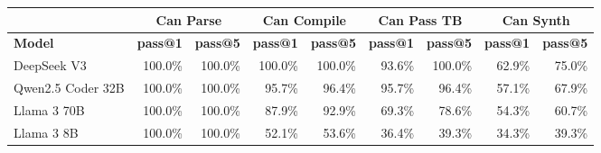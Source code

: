 \begin{tabular}{l|rr|rr|rr|rr}
\cmidrule[\heavyrulewidth]{2-9}
 & \multicolumn{2}{c|}{\textbf{Can Parse}} & \multicolumn{2}{c|}{\textbf{Can Compile}} & \multicolumn{2}{c|}{\textbf{Can Pass TB}} & \multicolumn{2}{c}{\textbf{Can Synth}} \\
\midrule
 \textbf{Model} & \textbf{pass@1} & \textbf{pass@5} & \textbf{pass@1} & \textbf{pass@5} & \textbf{pass@1} & \textbf{pass@5} & \textbf{pass@1} & \textbf{pass@5} \\
\midrule
DeepSeek V3 & 100.0\% & 100.0\% & 100.0\% & 100.0\% & 93.6\% & 100.0\% & 62.9\% & 75.0\% \\
Qwen2.5 Coder 32B & 100.0\% & 100.0\% & 95.7\% & 96.4\% & 95.7\% & 96.4\% & 57.1\% & 67.9\% \\
Llama 3 70B & 100.0\% & 100.0\% & 87.9\% & 92.9\% & 69.3\% & 78.6\% & 54.3\% & 60.7\% \\
Llama 3 8B & 100.0\% & 100.0\% & 52.1\% & 53.6\% & 36.4\% & 39.3\% & 34.3\% & 39.3\% \\
\bottomrule
\end{tabular}
